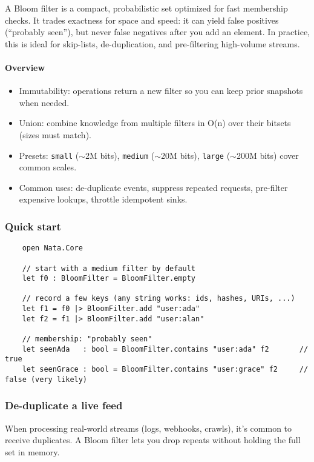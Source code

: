 \documentclass{article}
\begin{document}
\noindent A Bloom filter is a compact, probabilistic set optimized for fast membership checks. It trades exactness for space and speed: it can yield false positives (``probably seen''), but never false negatives after you add an element. In practice, this is ideal for skip-lists, de-duplication, and pre-filtering high-volume streams.

\paragraph{Overview}
\begin{itemize}
  \item Immutability: operations return a new filter so you can keep prior snapshots when needed.
  \item Union: combine knowledge from multiple filters in O(n) over their bitsets (sizes must match).
  \item Presets: \texttt{small} ($\sim$2M bits), \texttt{medium} ($\sim$20M bits), \texttt{large} ($\sim$200M bits) cover common scales.
  \item Common uses: de-duplicate events, suppress repeated requests, pre-filter expensive lookups, throttle idempotent sinks.
\end{itemize}

\subsubsection{Quick start}
\begin{verbatim}
    open Nata.Core

    // start with a medium filter by default
    let f0 : BloomFilter = BloomFilter.empty

    // record a few keys (any string works: ids, hashes, URIs, ...)
    let f1 = f0 |> BloomFilter.add "user:ada"
    let f2 = f1 |> BloomFilter.add "user:alan"

    // membership: "probably seen"
    let seenAda   : bool = BloomFilter.contains "user:ada" f2       // true
    let seenGrace : bool = BloomFilter.contains "user:grace" f2     // false (very likely)
\end{verbatim}

\subsubsection{De-duplicate a live feed}
When processing real-world streams (logs, webhooks, crawls), it’s common to receive duplicates. A Bloom filter lets you drop repeats without holding the full set in memory.
\end{document}
